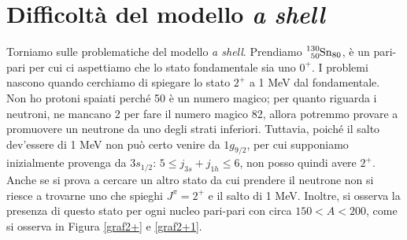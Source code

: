 \section{Difficoltà del modello \textit{a shell}}
Torniamo sulle problematiche del modello \textit{a shell}. Prendiamo $\ce{^{130}_{50}Sn_{80}}$, è un pari-pari per cui ci aspettiamo che lo stato fondamentale sia uno $0^+$. I problemi nascono quando cerchiamo di spiegare lo stato $2^+$ a 1 MeV dal fondamentale. Non ho protoni spaiati perché 50 è un numero magico; per quanto riguarda i neutroni, ne mancano 2 per fare il numero magico 82, allora potremmo provare a promuovere un neutrone da uno degli strati inferiori. Tuttavia, poiché il salto dev'essere di 1 MeV non può certo venire da $1g_{9/2}$, per cui supponiamo inizialmente provenga da $3s_{1/2}$: $5\leq j_{3s} + j_{1h}\leq6$, non posso quindi avere $2^+$. Anche se si prova a cercare un altro stato da cui prendere il neutrone non si riesce a trovarne uno che spieghi $J^\pi=2^+$ e il salto di 1 MeV. Inoltre, si osserva la presenza di questo stato per ogni nucleo pari-pari con circa $150<A<200$, come si osserva in Figura \ref{graf2+} e \ref{graf2+1}.

